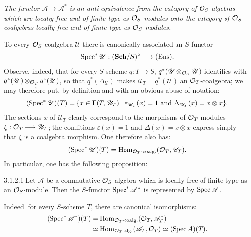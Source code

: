 \emph{The functor $\mathscr A\mapsto\mathscr A^*$ is an anti-equivalence from the category of $\mathcal{O}_S$-algebras which are locally free and of finite type as $\mathcal{O}_S$-modules onto the category of $\mathcal{O}_S$-coalgebras locally free and of finite type as $\mathcal{O}_S$-modules.}

To every $\mathcal{O}_S$-coalgebra $\mathscr U$ there is canonically associated an $S$-functor
\[
\operatorname{Spec}^*\mathscr U:(\mathbf{Sch}/S)^\circ\longrightarrow\textup{(Ens)}.
\]
Observe, indeed, that for every $S$-scheme $q:T\to S$, $q^*(\mathscr U\otimes_{\mathcal{O}_S}\mathscr U)$ identifies with $q^*(\mathscr U)\otimes_{\mathcal{O}_T}q^*(\mathscr U)$, so that $q^*(\Delta_{\mathscr U})$ makes $\mathscr U_T=q^*(\mathscr U)$ an $\mathcal{O}_T$-coalgebra; we may therefore put, by definition and with an obvious abuse of notation:
\[
(\operatorname{Spec}^*\mathscr U)(T)=\{x\in\Gamma(T,\mathscr U_T)\mid\varepsilon_{\mathscr U_T}(x)=1\text{ and }\Delta_{\mathscr U_T}(x)=x\otimes x\}.
\]
The sections $x$ of $\mathscr U_T$ clearly correspond to the morphisms of $\mathcal{O}_T$-modules $\xi:\mathcal{O}_T\longrightarrow\mathscr U_T$; the conditions $\varepsilon(x)=1$ and $\Delta(x)=x\otimes x$ express simply that $\xi$ is a coalgebra morphism. One therefore also has:
\[
(\operatorname{Spec}^*\mathscr U)(T)=\operatorname{Hom}_{\mathcal{O}_T\text{-coalg.}}(\mathcal{O}_T,\mathscr U_T).
\]
In particular, one has the following proposition:

\begin{proposition}{3.1.2.1}\label{VIIA.3.1.2.1}
Let $\mathscr A$ be a commutative $\mathcal{O}_S$-algebra which is locally free of finite type as an $\mathcal{O}_S$-module. Then the $S$-functor $\operatorname{Spec}^*\mathscr A^*$ is represented by $\operatorname{Spec}\mathscr A$.
\end{proposition}
Indeed, for every $S$-scheme $T$, there are canonical isomorphisms:
\[
\begin{aligned}
(\operatorname{Spec}^*\mathscr A^*)(T)&=\operatorname{Hom}_{\mathcal{O}_T\text{-coalg.}}(\mathcal{O}_T,\mathscr A_T^*)\\
&\simeq\operatorname{Hom}_{\mathcal{O}_T\text{-alg.}}(\mathscr A_T,\mathcal{O}_T)\simeq(\operatorname{Spec} A)(T).
\end{aligned}
\]

